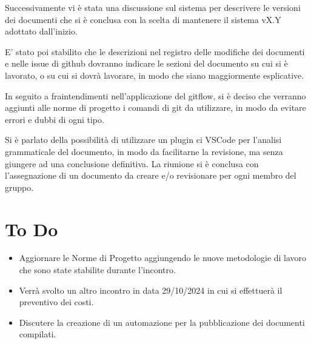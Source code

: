 \documentclass[a4paper, 12pt]{article}
\begin{document}
Successivamente vi è stata una discussione sul sistema per descrivere le versioni dei documenti che si è conclusa con la scelta di mantenere il sistema vX.Y adottato dall’inizio.

E’ stato poi stabilito che le  descrizioni nel registro delle modifiche dei documenti e nelle issue di github dovranno indicare le sezioni del documento su cui si è lavorato, o su cui si dovrà lavorare, in modo che siano maggiormente esplicative.

In seguito a fraintendimenti nell’applicazione del gitflow, si è deciso che verranno aggiunti alle norme di progetto i comandi di git da utilizzare, in modo da evitare errori e dubbi di ogni tipo.

Si è parlato della possibilità di utilizzare un plugin ci VSCode per l’analisi grammaticale del documento, in modo da facilitarne la revisione,  ma senza giungere ad una conclusione definitiva.
La riunione si è conclusa con l’assegnazione di un documento da creare e/o revisionare per ogni membro del gruppo.

\section{To Do}
\begin{itemize}
    \item Aggiornare le Norme di Progetto aggiungendo le nuove metodologie di lavoro che sono state stabilite durante l’incontro.
    \item Verrà svolto un altro incontro in data 29/10/2024 in cui si effettuerà il preventivo dei costi.
    \item Discutere la creazione di un automazione per la pubblicazione dei documenti compilati.
\end{itemize}
\end{document}
